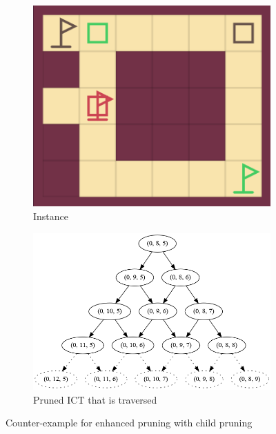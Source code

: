 \documentclass[english]{article}
\begin{document}
	\begin{figure}
	\centering
	\begin{subfigure}{0.40\textwidth}
		\centering
		\includegraphics[width=\linewidth]{img/counter-example-ep-2}
		\caption{Instance}
		\label{fig:counter-example:a}
	\end{subfigure}
	\begin{subfigure}{0.49\textwidth}
		\centering
		\includegraphics[width=\linewidth]{img/counter-example-tree}
		\caption{Pruned ICT that is traversed}
		\label{fig:counter-example:b}
	\end{subfigure}
		\caption{Counter-example for enhanced pruning with child pruning}
		\label{fig:counter-example}
	\end{figure}
\end{document}
